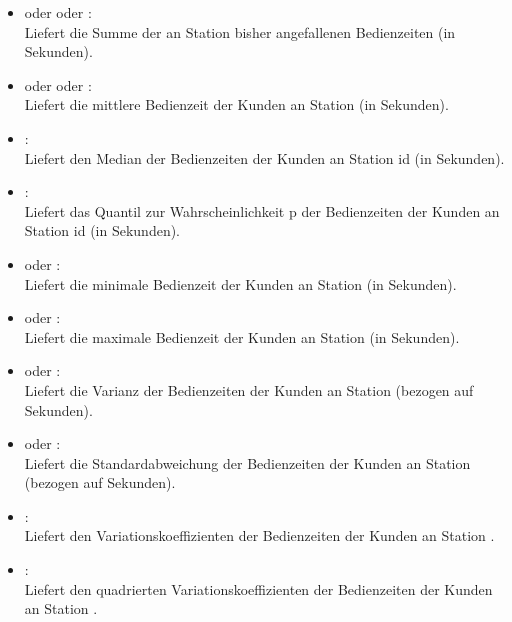 \begin{itemize}

\item
{} oder  oder :\\
Liefert die Summe der an Station  bisher angefallenen Bedienzeiten (in Sekunden).

\item
{} oder  oder :\\
Liefert die mittlere Bedienzeit der Kunden an Station  (in Sekunden).

\item
{}:\\
Liefert den Median der Bedienzeiten der Kunden an Station id (in Sekunden).

\item
{}:\\
Liefert das Quantil zur Wahrscheinlichkeit p der Bedienzeiten der Kunden an Station id (in Sekunden).

\item
{} oder :\\
Liefert die minimale Bedienzeit der Kunden an Station  (in Sekunden).

\item
{} oder :\\
Liefert die maximale Bedienzeit der Kunden an Station  (in Sekunden).

\item
{} oder :\\
Liefert die Varianz der Bedienzeiten der Kunden an Station  (bezogen auf Sekunden).

\item
{} oder :\\
Liefert die Standardabweichung der Bedienzeiten der Kunden an Station  (bezogen auf Sekunden).

\item
{}:\\
Liefert den Variationskoeffizienten der Bedienzeiten der Kunden an Station .

\item
{}:\\
Liefert den quadrierten Variationskoeffizienten der Bedienzeiten der Kunden an Station .


\end{itemize}
